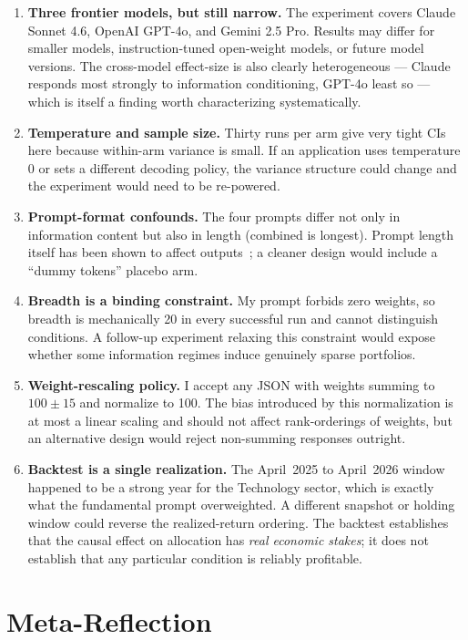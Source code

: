 \documentclass[11pt]{article}
\begin{document}
\begin{enumerate}
\item \textbf{Three frontier models, but still narrow.} The experiment
covers Claude Sonnet 4.6, OpenAI GPT-4o, and Gemini 2.5 Pro. Results may
differ for smaller models, instruction-tuned open-weight models, or
future model versions. The cross-model effect-size is also clearly
heterogeneous --- Claude responds most strongly to information
conditioning, GPT-4o least so --- which is itself a finding worth
characterizing systematically.
\item \textbf{Temperature and sample size.} Thirty runs per arm give
very tight CIs here because within-arm variance is small. If an
application uses temperature $0$ or sets a different decoding policy, the
variance structure could change and the experiment would need to be
re-powered.
\item \textbf{Prompt-format confounds.} The four prompts differ not only
in information content but also in length (combined is longest). Prompt
length itself has been shown to affect outputs~\cite{Sclar2024}; a
cleaner design would include a ``dummy tokens'' placebo arm.
\item \textbf{Breadth is a binding constraint.} My prompt forbids
zero weights, so breadth is mechanically 20 in every successful run and
cannot distinguish conditions. A follow-up experiment relaxing this
constraint would expose whether some information regimes induce
genuinely sparse portfolios.
\item \textbf{Weight-rescaling policy.} I accept any JSON with weights
summing to $100 \pm 15$ and normalize to 100. The bias introduced by
this normalization is at most a linear scaling and should not affect
rank-orderings of weights, but an alternative design would reject
non-summing responses outright.
\item \textbf{Backtest is a single realization.} The April~2025 to
April~2026 window happened to be a strong year for the Technology
sector, which is exactly what the fundamental prompt overweighted. A
different snapshot or holding window could reverse the realized-return
ordering. The backtest establishes that the causal effect on allocation
has \emph{real economic stakes}; it does not establish that any
particular condition is reliably profitable.
\end{enumerate}

\section{Meta-Reflection}
\end{document}
